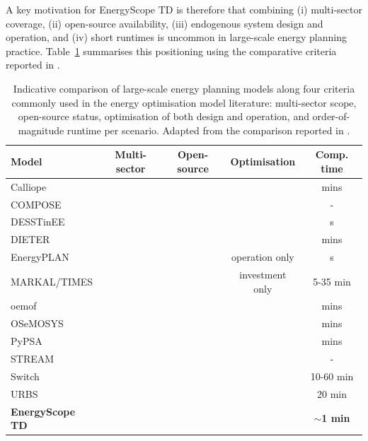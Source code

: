 \documentclass{article}
\newcommand{\cmark}{\ding{51}}
\newcommand{\xmark}{\ding{55}}
\begin{document}
A key motivation for EnergyScope TD is therefore that combining (i) multi-sector coverage, (ii) open-source availability, (iii) endogenous system design and operation, and (iv) short runtimes is uncommon in large-scale energy planning practice. Table~\ref{tab:model-comparison} summarises this positioning using the comparative criteria reported in \citet{limpens_energyscope_2019}.

\begin{table}[t]
  \centering
  \renewcommand{\arraystretch}{1.15}
  \begin{tabularx}{\linewidth}{lcccc}
    \toprule
    \textbf{Model} & \textbf{Multi-sector} & \textbf{Open-source} & \textbf{Optimisation} & \textbf{Comp. time} \\
    \midrule
    Calliope        & \cmark & \cmark & \cmark & mins \\
    COMPOSE         & \cmark & \xmark & \cmark & - \\
    DESSTinEE       & \cmark & \cmark & \xmark & s \\
    DIETER          & \xmark & \cmark & \cmark & mins \\
    EnergyPLAN      & \cmark & \xmark & operation only  & s \\
    MARKAL/TIMES    & \cmark & \xmark & investment only & 5-35 min \\
    oemof           & \cmark & \cmark & \cmark & mins \\
    OSeMOSYS        & \cmark & \cmark & \cmark & mins \\
    PyPSA           & \cmark & \cmark & \cmark & mins \\
    STREAM          & \cmark & \xmark & \xmark & - \\
    Switch          & \xmark & \cmark & \cmark & 10-60 min \\
    URBS            & \xmark & \cmark & \cmark & 20 min \\
    \addlinespace
    \textbf{EnergyScope TD} & \textbf{\cmark} & \textbf{\cmark} & \textbf{\cmark} & \textbf{$\sim$1 min} \\
    \bottomrule
  \end{tabularx}
  \caption{Indicative comparison of large-scale energy planning models along four criteria commonly used in the energy optimisation model literature: multi-sector scope, open-source status, optimisation of both design and operation, and order-of-magnitude runtime per scenario. Adapted from the comparison reported in \citet{limpens_energyscope_2019}.}
  \label{tab:model-comparison}
\end{table}
\end{document}
